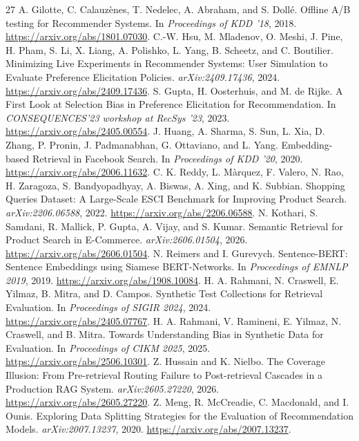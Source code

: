 \documentclass[11pt]{article}
\begin{document}
\begin{thebibliography}{27}
 A. Gilotte, C. Calauz\`enes, T. Nedelec, A. Abraham, and S. Doll\'e. Offline A/B testing for Recommender Systems. In \emph{Proceedings of KDD '18}, 2018. \url{https://arxiv.org/abs/1801.07030}.
 C.-W. Hsu, M. Mladenov, O. Meshi, J. Pine, H. Pham, S. Li, X. Liang, A. Polishko, L. Yang, B. Scheetz, and C. Boutilier. Minimizing Live Experiments in Recommender Systems: User Simulation to Evaluate Preference Elicitation Policies. \emph{arXiv:2409.17436}, 2024. \url{https://arxiv.org/abs/2409.17436}.
 S. Gupta, H. Oosterhuis, and M. de Rijke. A First Look at Selection Bias in Preference Elicitation for Recommendation. In \emph{CONSEQUENCES'23 workshop at RecSys '23}, 2023. \url{https://arxiv.org/abs/2405.00554}.
 J. Huang, A. Sharma, S. Sun, L. Xia, D. Zhang, P. Pronin, J. Padmanabhan, G. Ottaviano, and L. Yang. Embedding-based Retrieval in Facebook Search. In \emph{Proceedings of KDD '20}, 2020. \url{https://arxiv.org/abs/2006.11632}.
 C. K. Reddy, L. M\`arquez, F. Valero, N. Rao, H. Zaragoza, S. Bandyopadhyay, A. Biswas, A. Xing, and K. Subbian. Shopping Queries Dataset: A Large-Scale ESCI Benchmark for Improving Product Search. \emph{arXiv:2206.06588}, 2022. \url{https://arxiv.org/abs/2206.06588}.
 N. Kothari, S. Samdani, R. Mallick, P. Gupta, A. Vijay, and S. Kumar. Semantic Retrieval for Product Search in E-Commerce. \emph{arXiv:2606.01504}, 2026. \url{https://arxiv.org/abs/2606.01504}.
 N. Reimers and I. Gurevych. Sentence-BERT: Sentence Embeddings using Siamese BERT-Networks. In \emph{Proceedings of EMNLP 2019}, 2019. \url{https://arxiv.org/abs/1908.10084}.
 H. A. Rahmani, N. Craswell, E. Yilmaz, B. Mitra, and D. Campos. Synthetic Test Collections for Retrieval Evaluation. In \emph{Proceedings of SIGIR 2024}, 2024. \url{https://arxiv.org/abs/2405.07767}.
 H. A. Rahmani, V. Ramineni, E. Yilmaz, N. Craswell, and B. Mitra. Towards Understanding Bias in Synthetic Data for Evaluation. In \emph{Proceedings of CIKM 2025}, 2025. \url{https://arxiv.org/abs/2506.10301}.
 Z. Hussain and K. Nielbo. The Coverage Illusion: From Pre-retrieval Routing Failure to Post-retrieval Cascades in a Production RAG System. \emph{arXiv:2605.27220}, 2026. \url{https://arxiv.org/abs/2605.27220}.
 Z. Meng, R. McCreadie, C. Macdonald, and I. Ounis. Exploring Data Splitting Strategies for the Evaluation of Recommendation Models. \emph{arXiv:2007.13237}, 2020. \url{https://arxiv.org/abs/2007.13237}.

\end{thebibliography}
\end{document}
